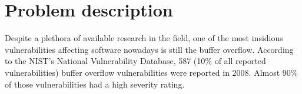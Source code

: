 \section{Problem description} \label{ins:problem}
Despite a plethora of available research in the field, one of the most insidious vulnerabilities affecting software nowadays is still the buffer overflow. According to the NIST's National Vulnerability Database\cite{nist}, 587 (10\% of all reported vulnerabilities) buffer overflow vulnerabilities were reported in 2008. Almost 90\% of those vulnerabilities had a high severity rating.
%
%
%
%   
%
%
%


